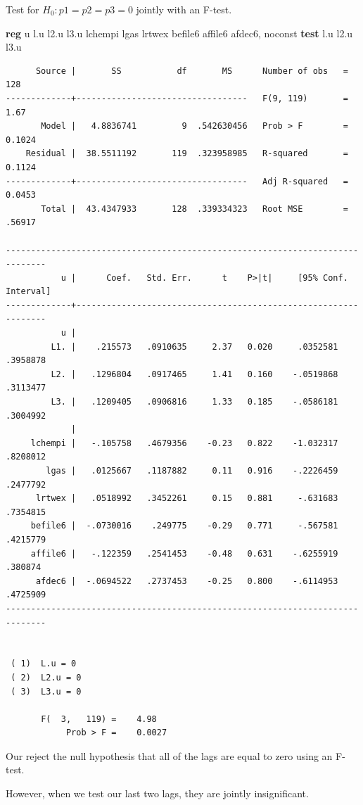 \documentclass[
]{book}
\newenvironment{Shaded}{\begin{snugshade}}{\end{snugshade}}
\newcommand{\KeywordTok}[1]{\textcolor[rgb]{0.13,0.29,0.53}{\textbf{#1}}}
\newcommand{\NormalTok}[1]{#1}
\newcommand{\OtherTok}[1]{\textcolor[rgb]{0.56,0.35,0.01}{#1}}
\begin{document}
Test for \(H_{0}: p1=p2=p3=0\) jointly with an F-test.

\begin{Shaded}
\begin{Highlighting}[]
\KeywordTok{reg}\NormalTok{ u }\OtherTok{l}\NormalTok{.u l2.u l3.u lchempi lgas lrtwex befile6 affile6 afdec6, noconst}
\KeywordTok{test} \OtherTok{l}\NormalTok{.u l2.u l3.u}
\end{Highlighting}
\end{Shaded}

\begin{verbatim}
      Source |       SS           df       MS      Number of obs   =       128
-------------+----------------------------------   F(9, 119)       =      1.67
       Model |   4.8836741         9  .542630456   Prob > F        =    0.1024
    Residual |  38.5511192       119  .323958985   R-squared       =    0.1124
-------------+----------------------------------   Adj R-squared   =    0.0453
       Total |  43.4347933       128  .339334323   Root MSE        =    .56917

------------------------------------------------------------------------------
           u |      Coef.   Std. Err.      t    P>|t|     [95% Conf. Interval]
-------------+----------------------------------------------------------------
           u |
         L1. |    .215573   .0910635     2.37   0.020     .0352581    .3958878
         L2. |   .1296804   .0917465     1.41   0.160    -.0519868    .3113477
         L3. |   .1209405   .0906816     1.33   0.185    -.0586181    .3004992
             |
     lchempi |   -.105758   .4679356    -0.23   0.822    -1.032317    .8208012
        lgas |   .0125667   .1187882     0.11   0.916    -.2226459    .2477792
      lrtwex |   .0518992   .3452261     0.15   0.881     -.631683    .7354815
     befile6 |  -.0730016    .249775    -0.29   0.771     -.567581    .4215779
     affile6 |   -.122359   .2541453    -0.48   0.631    -.6255919     .380874
      afdec6 |  -.0694522   .2737453    -0.25   0.800    -.6114953    .4725909
------------------------------------------------------------------------------


 ( 1)  L.u = 0
 ( 2)  L2.u = 0
 ( 3)  L3.u = 0

       F(  3,   119) =    4.98
            Prob > F =    0.0027
\end{verbatim}

Our reject the null hypothesis that all of the lags are equal to zero using an F-test.

However, when we test our last two lags, they are jointly insignificant.
\end{document}

